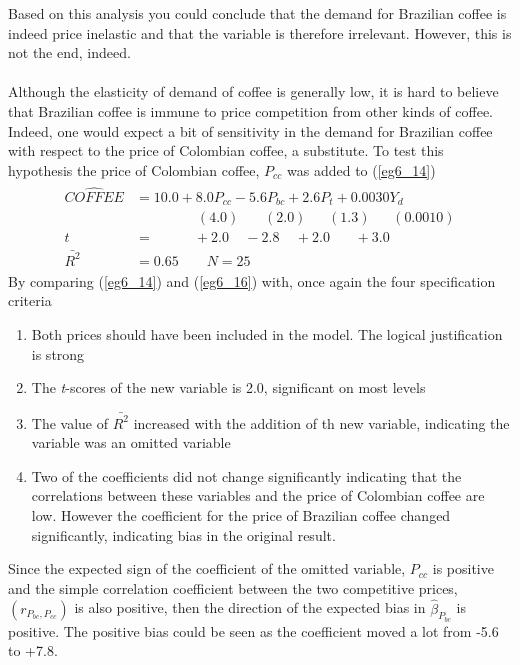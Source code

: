 \documentclass[11pt]{article}
\begin{document}
Based on this analysis you could conclude that the demand for Brazilian coffee is indeed price inelastic and that the variable is therefore irrelevant. However, this is not the end, indeed.\\ \\
Although the elasticity of demand of coffee is generally low, it is hard to believe that Brazilian coffee is immune to price competition from other kinds of coffee. Indeed, one would expect a bit of sensitivity in the demand for Brazilian coffee with respect to the price of Colombian coffee, a substitute. To test this hypothesis the price of Colombian coffee, $P_{cc}$ was added to (\ref{eg6_14})
\begin{align}
\label{eg6_16}
\begin{split}
\widehat{COFFEE} &= 10.0 + {8.0P_{cc}}  -{5.6P_{bc}} + {2.6P_t} + {0.0030Y_d}\\
&\>\>\>\>\>\>\>\>\>\>\>\>\>\>\>\>\>\>\>\> (4.0) 
\>\>\>\>\>\>\>\> (2.0)
\>\>\>\>\>\>\>(1.3)
\>\>\>\>\>\>\> (0.0010)\\
t&=\>\>\>\>\>\>\>\>\>\>\>\>\> +2.0 
\>\>\>\>\> -2.8
\>\>\>\>\> +2.0
\>\>\>\>\>\>\>\> +3.0\\
\bar{R^2}&= 0.65 \quad\quad N=25
\end{split}
\end{align}
By comparing (\ref{eg6_14}) and (\ref{eg6_16}) with, once again the four specification criteria
\begin{enumerate}
\item Both prices should have been included in the model. The logical justification is strong
\item The \textit{t}-scores of the new variable is 2.0, significant on most levels
\item The value of $\bar{R^2}$ increased with the addition of th new variable, indicating the variable was an omitted variable
\item Two of the coefficients did not change significantly indicating that the correlations between these variables and the price of Colombian coffee are low. However the coefficient for the price of Brazilian coffee changed significantly, indicating bias in the original result.
\end{enumerate}
Since the expected sign of the coefficient of the omitted variable, $P_{cc}$ is positive and the simple correlation coefficient between the two competitive prices, $(r_{P_{bc}, P_{cc}})$ is also positive, then the direction of the expected bias in $\hat{\beta}_{P_{bc}}$ is positive. The positive bias could be seen as the coefficient moved a lot from -5.6 to +7.8.
\end{document}
